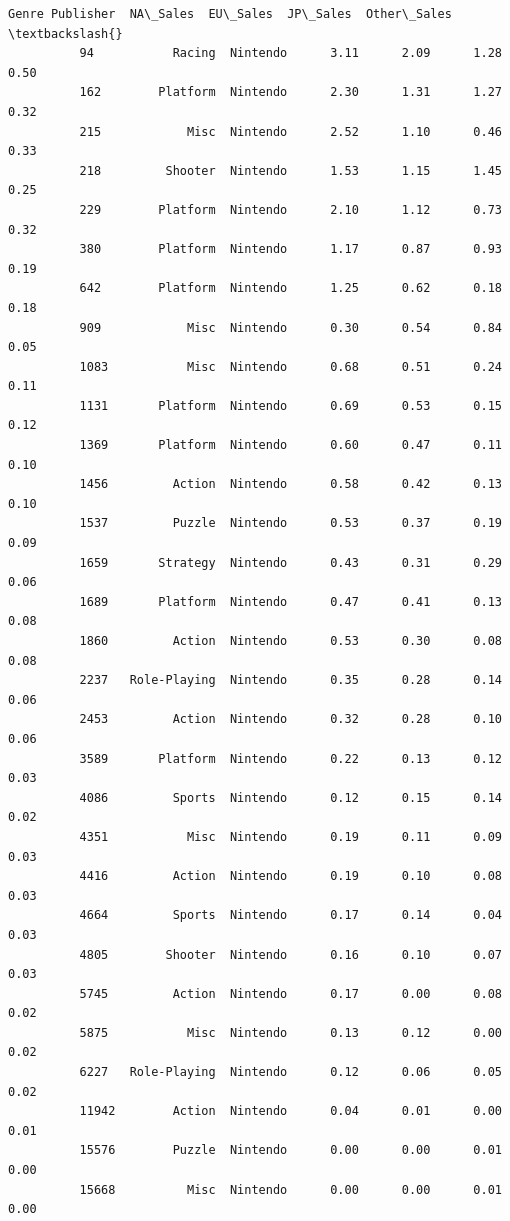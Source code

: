 \documentclass[11pt]{article}
\begin{document}
\begin{Verbatim}[commandchars=\\\{\}]
                        Genre Publisher  NA\_Sales  EU\_Sales  JP\_Sales  Other\_Sales  \textbackslash{}
          94           Racing  Nintendo      3.11      2.09      1.28         0.50   
          162        Platform  Nintendo      2.30      1.31      1.27         0.32   
          215            Misc  Nintendo      2.52      1.10      0.46         0.33   
          218         Shooter  Nintendo      1.53      1.15      1.45         0.25   
          229        Platform  Nintendo      2.10      1.12      0.73         0.32   
          380        Platform  Nintendo      1.17      0.87      0.93         0.19   
          642        Platform  Nintendo      1.25      0.62      0.18         0.18   
          909            Misc  Nintendo      0.30      0.54      0.84         0.05   
          1083           Misc  Nintendo      0.68      0.51      0.24         0.11   
          1131       Platform  Nintendo      0.69      0.53      0.15         0.12   
          1369       Platform  Nintendo      0.60      0.47      0.11         0.10   
          1456         Action  Nintendo      0.58      0.42      0.13         0.10   
          1537         Puzzle  Nintendo      0.53      0.37      0.19         0.09   
          1659       Strategy  Nintendo      0.43      0.31      0.29         0.06   
          1689       Platform  Nintendo      0.47      0.41      0.13         0.08   
          1860         Action  Nintendo      0.53      0.30      0.08         0.08   
          2237   Role-Playing  Nintendo      0.35      0.28      0.14         0.06   
          2453         Action  Nintendo      0.32      0.28      0.10         0.06   
          3589       Platform  Nintendo      0.22      0.13      0.12         0.03   
          4086         Sports  Nintendo      0.12      0.15      0.14         0.02   
          4351           Misc  Nintendo      0.19      0.11      0.09         0.03   
          4416         Action  Nintendo      0.19      0.10      0.08         0.03   
          4664         Sports  Nintendo      0.17      0.14      0.04         0.03   
          4805        Shooter  Nintendo      0.16      0.10      0.07         0.03   
          5745         Action  Nintendo      0.17      0.00      0.08         0.02   
          5875           Misc  Nintendo      0.13      0.12      0.00         0.02   
          6227   Role-Playing  Nintendo      0.12      0.06      0.05         0.02   
          11942        Action  Nintendo      0.04      0.01      0.00         0.01   
          15576        Puzzle  Nintendo      0.00      0.00      0.01         0.00   
          15668          Misc  Nintendo      0.00      0.00      0.01         0.00   
          

\end{Verbatim}
\end{document}

